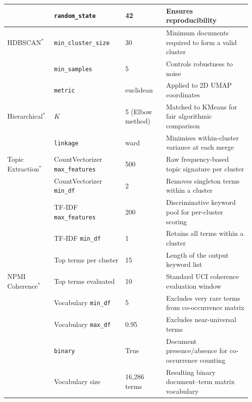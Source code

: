 \documentclass[a4paper,10pt,conference]{IEEEtran}
\begin{document}
\begin{table}[t]
{\begin{tabular}{@{}lllp{8cm}@{}}
                     & \texttt{random\_state}           & 42                          & Ensures reproducibility \\
\midrule
HDBSCAN$^{*}$       & \texttt{min\_cluster\_size}      & 30                          & Minimum documents required to form a valid cluster \\
                     & \texttt{min\_samples}            & 5                           & Controls robustness to noise \\
                     & \texttt{metric}                  & euclidean                   & Applied to 2D UMAP coordinates \\
\midrule
Hierarchical$^{*}$  & $K$                              & 5 (Elbow method)            & Matched to KMeans for fair algorithmic comparison \\
                     & \texttt{linkage}                 & ward                        & Minimises within-cluster variance at each merge \\
\midrule
Topic Extraction$^{*}$ & CountVectorizer \texttt{max\_features} & 500              & Raw frequency-based topic signature per cluster \\
                     & CountVectorizer \texttt{min\_df} & 2                           & Removes singleton terms within a cluster \\
                     & TF-IDF \texttt{max\_features}    & 200                         & Discriminative keyword pool for per-cluster scoring \\
                     & TF-IDF \texttt{min\_df}          & 1                           & Retains all terms within a cluster \\
                     & Top terms per cluster            & 15                          & Length of the output keyword list \\
\midrule
NPMI Coherence$^{*}$ & Top terms evaluated             & 10                          & Standard UCI coherence evaluation window \\
                     & Vocabulary \texttt{min\_df}      & 5                           & Excludes very rare terms from co-occurrence matrix \\
                     & Vocabulary \texttt{max\_df}      & 0.95                        & Excludes near-universal terms \\
                     & \texttt{binary}                  & True                        & Document presence/absence for co-occurrence counting \\
                     & Vocabulary size                  & 16{,}286 terms              & Resulting binary document--term matrix vocabulary \\
\bottomrule
\end{tabular}%
}
\end{table}
\end{document}
